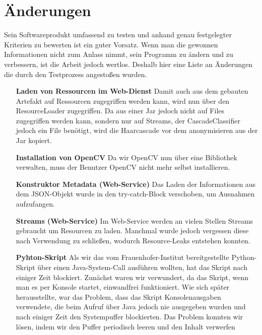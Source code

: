 \chapter{Änderungen} \label{Changelog}
Sein Softwareprodukt umfassend zu testen und anhand genau festgelegter Kriterien zu bewerten ist ein guter Vorsatz. Wenn man die gewonnen Informationen nicht zum Anlass nimmt, sein Programm zu ändern und zu verbessern, ist die Arbeit jedoch wertlos. Deshalb hier eine Liste an Änderungen die durch den Testprozess angestoßen wurden.

\begin{itemize}
\item[\textbf{Laden von Ressourcen im Web-Dienst}] Damit auch aus dem gebauten Artefakt auf Ressourcen zugegriffen werden kann, wird nun über den ResourceLoader zugegriffen. Da aus einer Jar jedoch nicht auf Files zugegriffen werden kann, sondern nur auf Streams, der CascadeClassifier jedoch ein File benötigt, wird die Haarcascade vor dem anonymisieren aus der Jar kopiert.
\item[\textbf{Installation von OpenCV}] Da wir OpenCV nun über eine Bibliothek verwalten, muss der Benutzer OpenCV nicht mehr selbst installieren.
\item[\textbf{Konstruktor Metadata (Web-Service)}] Das Laden der Informationen aus dem JSON-Objekt wurde in den try-catch-Block verschoben, um Ausnahmen aufzufangen.
\item[\textbf{Streams (Web-Service)}] Im Web-Service werden an vielen Stellen Streams gebraucht um Resourcen zu laden. Manchmal wurde jedoch vergessen diese nach Verwendung zu schließen, wodurch Resource-Leaks entstehen konnten.
\item[\textbf{Pyhton-Skript}] Als wir das vom Frauenhofer-Institut bereitgestellte Python-Skript über einen Java-System-Call ausführen wollten, hat das Skript nach einiger Zeit blockiert. Zunächst waren wir verwundert, da das Skript, wenn man es per Konsole startet, einwandfrei funktioniert. Wie sich später herausstellte, war das Problem, dass das Skript Konsolenausgaben verwendete, die beim Aufruf über Java jedoch nie ausgegeben wurden und nach einiger Zeit den Systempuffer blockierten. Das Problem konnten wir lösen, indem wir den Puffer periodisch leeren und den Inhalt verwerfen
\end{itemize}